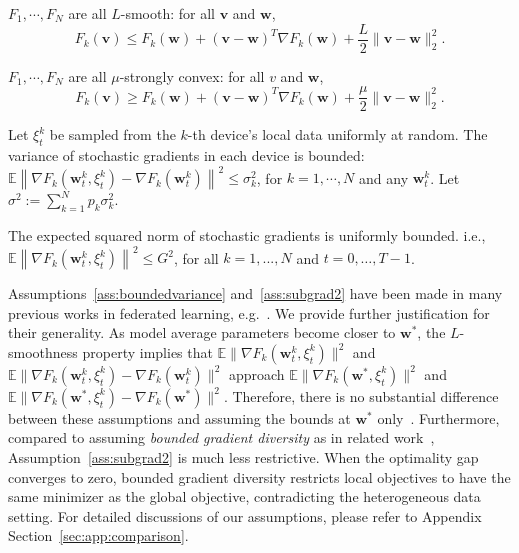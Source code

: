\begin{assumption}[$L$-smoothness]
	$F_{1}, \cdots, F_{N}$ are all $L$-smooth: for all  $\mathbf{v}$  and $\mathbf{w}$, 
	\begin{equation}
	  F_{k}(\mathbf{v}) \leq F_{k}(\mathbf{w})+(\mathbf{v}-  \mathbf{w})^{T} \nabla F_{k}(\mathbf{w})+\frac{L}{2}\|\mathbf{v}-\mathbf{w}\|_{2}^{2}.
	\end{equation}
	\label{ass:lsmooth}
\end{assumption}
\begin{assumption}
	$F_{1}, \cdots, F_{N}$ are all $\mu$-strongly convex: for all $v$ and  $\mathbf{w}$,
	\begin{equation}
	   F_{k}(\mathbf{v}) \geq F_{k}(\mathbf{w})+(\mathbf{v}-\mathbf{w})^{T} \nabla F_{k}(\mathbf{w})+\frac{\mu}{2}\|\mathbf{v}-\mathbf{w}\|_{2}^{2}.
	\end{equation}
	\label{ass:stroncvx}
\end{assumption}
\begin{assumption}
	Let $\xi_{t}^{k}$ be sampled from the $k$-th device's local data uniformly at random. The variance of stochastic gradients in each device is bounded: $\mathbb{E}\left\|\nabla F_{k}\left(\mathbf{w}_{t}^{k}, \xi_{t}^{k}\right)-\nabla F_{k}\left(\mathbf{w}_{t}^{k}\right)\right\|^{2} \leq \sigma_{k}^{2}$,
	for $k=1, \cdots, N$ and any $\mathbf{w}_{t}^{k}$. Let $\sigma^2:=\sum_{k=1}^{N}p_k\sigma_{k}^{2}$.
	\label{ass:boundedvariance}
\end{assumption}
\begin{assumption}
	The expected squared norm of stochastic gradients is uniformly bounded. i.e.,
	$\mathbb{E}\left\|\nabla F_{k}\left(\mathbf{w}_{t}^{k}, \xi_{t}^{k}\right)\right\|^{2} \leq G^{2}$, for all $k = 1,..., N$ and $t=0, \dots, T-1$.
	\label{ass:subgrad2}
\end{assumption}
Assumptions~\ref{ass:boundedvariance} and~\ref{ass:subgrad2} have been made in many previous
works in federated learning, e.g.~\cite{yu2019parallel,li2019convergence,stich2018local}. We provide further justification for their generality. As model average parameters become
closer to $\mathbf{w}^{\ast}$, the $L$-smoothness property implies
that $\mathbb{E}\|\nabla F_{k}(\mathbf{w}_{t}^{k},\xi_{t}^{k})\|^{2}$
and $\mathbb{E}\|\nabla F_{k}(\mathbf{w}_{t}^{k},\xi_{t}^{k})-\nabla F_{k}(\mathbf{w}_{t}^{k})\|^{2}$
approach $\mathbb{E}\|\nabla F_{k}(\mathbf{w}^{\ast},\xi_{t}^{k})\|^{2}$
and $\mathbb{E}\|\nabla F_{k}(\mathbf{w}^{\ast},\xi_{t}^{k})-\nabla F_{k}(\mathbf{w}^{\ast})\|^{2}$.
Therefore, there is no substantial difference between these assumptions
and assuming the bounds at $\mathbf{w}^{\ast}$ only~\cite{koloskova2020unified}. Furthermore, compared to assuming \textit{bounded gradient diversity} as in related work~\cite{haddadpour2019convergence,li2018federated}, Assumption~\ref{ass:subgrad2} is much less restrictive. When the optimality gap converges to zero,
bounded gradient diversity restricts local objectives to have the same minimizer as the global objective, contradicting the heterogeneous data setting. 
For detailed discussions of our assumptions, please refer to Appendix Section~\ref{sec:app:comparison}.

